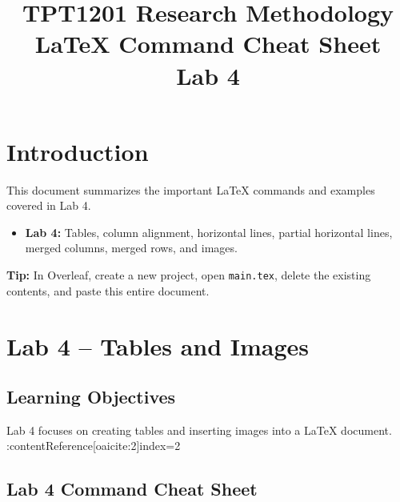 \documentclass[a4paper,10pt]{article}
\title{\textbf{TPT1201 Research Methodology}\\
LaTeX Command Cheat Sheet\\
\large Lab 4}
\author{}
\date{}
\begin{document}
\maketitle
\tableofcontents
\newpage


\section{Introduction}

This document summarizes the important LaTeX commands and examples
covered in Lab 4.

\begin{itemize}
    \item \textbf{Lab 4:} Tables, column alignment, horizontal lines,
    partial horizontal lines, merged columns, merged rows, and images.
\end{itemize}

\textbf{Tip:} In Overleaf, create a new project, open \texttt{main.tex},
delete the existing contents, and paste this entire document.

\newpage


\section{Lab 4 -- Tables and Images}

\subsection{Learning Objectives}

Lab 4 focuses on creating tables and inserting images into a
LaTeX document. :contentReference[oaicite:2]{index=2}


\subsection{Lab 4 Command Cheat Sheet}

\renewcommand{\arraystretch}{1.4}
\end{document}
